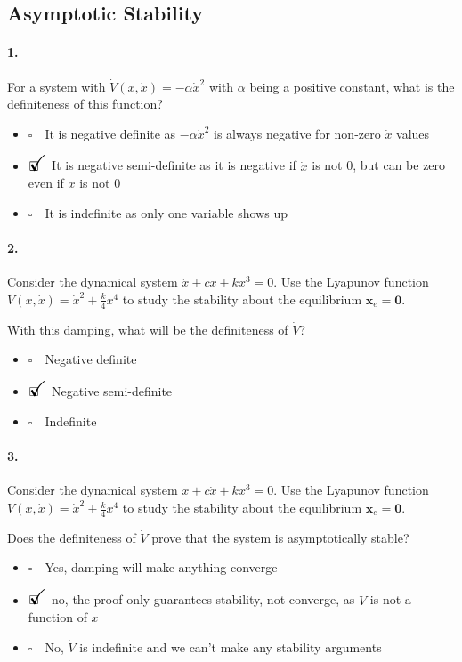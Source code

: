 \documentclass[12pt, a4paper]{article}
\newcommand{\ans}{\item[]$\rlap{\LARGE{\checkmark}}\square\quad$}
\newcommand{\noans}{\item[]$\square\quad$}
\begin{document}
\newpage
\subsection{Asymptotic Stability}
\paragraph{1.}
For a system with $\dot{V}(x,\dot{x})=-\alpha\dot x^{2}$ with $\alpha$ being a positive constant, what is the definiteness of this function?

\begin{itemize}
    \noans It is negative definite as $-\alpha\dot{x}^{2}$ is always negative for non-zero $\dot{x}$ values
    \ans It is negative semi-definite as it is negative if $\dot{x}$ is not 0, but can be zero even if $x$ is not 0
    \noans It is indefinite as only one variable shows up
\end{itemize}

\paragraph{2.}
Consider the dynamical system $\ddot{x}+c\dot{x}+kx^{3}=0$. Use the Lyapunov function $V(x,\dot{x})=\dot{x}^{2} + \frac{k}{4}x^{4}$ to study the stability about the equilibrium $\bm{x}_{e}=\bm{0}$. \medskip

With this damping, what will be the definiteness of $\dot{V}$?

\begin{itemize}
    \noans Negative definite
    \ans Negative semi-definite
    \noans Indefinite
\end{itemize}

\paragraph{3.}
Consider the dynamical system $\ddot{x}+c\dot{x}+kx^{3}=0$. Use the Lyapunov function $V(x,\dot{x})=\dot{x}^{2} + \frac{k}{4}x^{4}$ to study the stability about the equilibrium $\bm{x}_{e}=\bm{0}$. \medskip

Does the definiteness of $\dot{V}$ prove that the system is asymptotically stable?

\begin{itemize}
    \noans Yes, damping will make anything converge
    \ans no, the proof only guarantees stability, not converge, as $\dot{V}$ is not a function of $x$
    \noans No, $\dot{V}$ is indefinite and we can't make any stability arguments
\end{itemize}
\end{document}
